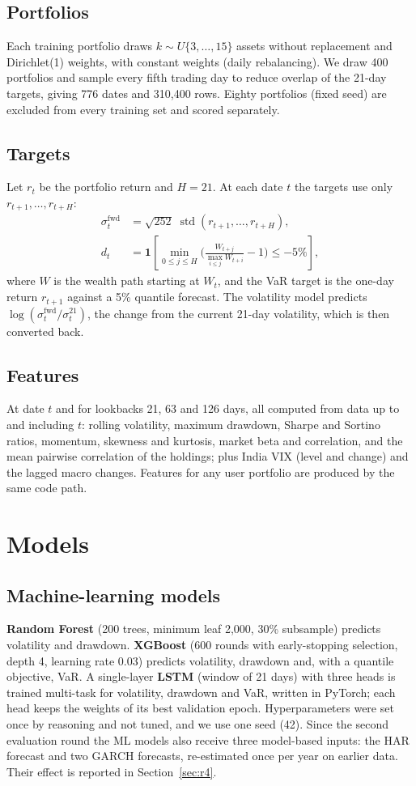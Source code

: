 \documentclass[conference,a4paper]{IEEEtran}
\newcommand{\volf}{\sigma^{\mathrm{fwd}}}
\begin{document}
\subsection{Portfolios}
Each training portfolio draws $k\sim U\{3,\dots,15\}$ assets without replacement and Dirichlet(1)
weights, with constant weights (daily rebalancing). We draw 400 portfolios and sample every fifth
trading day to reduce overlap of the 21-day targets, giving 776 dates and 310,400 rows. Eighty
portfolios (fixed seed) are excluded from every training set and scored separately.

\subsection{Targets}
Let $r_t$ be the portfolio return and $H=21$. At each date $t$ the targets use only
$r_{t+1},\dots,r_{t+H}$:
\begin{align}
\volf_t &= \sqrt{252}\;\operatorname{std}\!\left(r_{t+1},\dots,r_{t+H}\right),\\
d_t &= \mathbf 1\!\left[\min_{0\le j\le H}\!\Big(\tfrac{W_{t+j}}{\max_{i\le j}W_{t+i}}-1\Big)\le -5\%\right],
\end{align}
where $W$ is the wealth path starting at $W_t$, and the VaR target is the one-day return
$r_{t+1}$ against a 5\% quantile forecast. The volatility model predicts $\log(\volf_t/\sigma_t^{21})$,
the change from the current 21-day volatility, which is then converted back.

\subsection{Features}
At date $t$ and for lookbacks 21, 63 and 126 days, all computed from data up to and including $t$:
rolling volatility, maximum drawdown, Sharpe and Sortino ratios, momentum, skewness and kurtosis,
market beta and correlation, and the mean pairwise correlation of the holdings; plus India VIX
(level and change) and the lagged macro changes. Features for any user portfolio are produced by
the same code path.

\section{Models}
\subsection{Machine-learning models}
\textbf{Random Forest} (200 trees, minimum leaf 2,000, 30\% subsample) predicts volatility and
drawdown. \textbf{XGBoost} (600 rounds with early-stopping selection, depth 4, learning rate 0.03)
predicts volatility, drawdown and, with a quantile objective, VaR. A single-layer \textbf{LSTM}
(window of 21 days) with three heads is trained multi-task for volatility, drawdown and VaR,
written in PyTorch; each head keeps the weights of its best validation epoch. Hyperparameters were
set once by reasoning and not tuned, and we use one seed (42). Since the second evaluation round the
ML models also receive three model-based inputs: the HAR forecast and two GARCH forecasts,
re-estimated once per year on earlier data. Their effect is reported in Section~\ref{sec:r4}.
\end{document}
